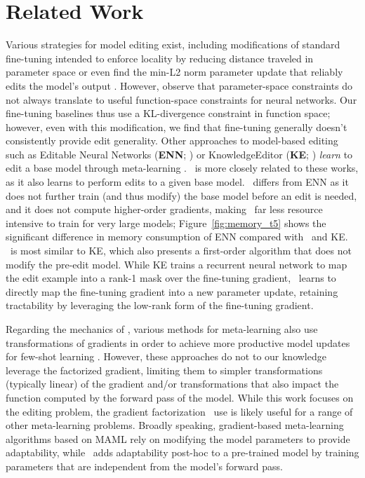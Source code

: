 \documentclass{article}
\begin{document}
\section{Related Work}



Various strategies for model editing exist, including modifications of standard fine-tuning intended to enforce locality by reducing distance traveled in parameter space \citep{zhu2020modifying} or even find the min-L2 norm parameter update that reliably edits the model's output \citep{Sotoudeh2021ProvableRO}. However, \cite{Cao2021EditingFK} observe that parameter-space constraints do not always translate to useful function-space constraints for neural networks. Our fine-tuning baselines thus use a KL-divergence constraint in function space; however, even with this modification, we find that fine-tuning generally doesn't consistently provide edit generality. Other approaches to model-based editing such as Editable Neural Networks (\textbf{ENN}; \cite{Sinitsin2020Editable}) or KnowledgeEditor (\textbf{KE}; \cite{Cao2021EditingFK}) \textit{learn} to edit a base model through meta-learning \citep{finn2017maml,ha2017hyper}. \name~is more closely related to these works, as it also learns to perform edits to a given base model. \name~differs from ENN as it does not further train (and thus modify) the base model before an edit is needed, and it does not compute higher-order gradients, making \name~far less resource intensive to train for very large models; Figure~\ref{fig:memory_t5} shows the significant difference in memory consumption of ENN compared with \name~and KE. \name~is most similar to KE, which also presents a first-order algorithm that does not modify the pre-edit model. While KE trains a recurrent neural network to map the edit example into a rank-1 mask over the fine-tuning gradient, \name~learns to directly map the fine-tuning gradient into a new parameter update, retaining tractability by leveraging the low-rank form of the fine-tuning gradient.

Regarding the mechanics of \name, various methods for meta-learning also use transformations of gradients in order to achieve more productive model updates for few-shot learning \citep{Ravi2017OptimizationAA,li2017metasgd,lee2018gradient,park2019meta,Flennerhag2020Meta-Learning}. However, these approaches do not to our knowledge leverage the factorized gradient, limiting them to simpler transformations (typically linear) of the gradient and/or transformations that also impact the function computed by the forward pass of the model. While this work focuses on the editing problem, the gradient factorization \name~use is likely useful for a range of other meta-learning problems. Broadly speaking, gradient-based meta-learning algorithms based on MAML \citep{finn2017maml,lee2018gradient,park2019meta,Flennerhag2020Meta-Learning} rely on modifying the model parameters to provide adaptability, while \name~adds adaptability post-hoc to a pre-trained model by training parameters that are independent from the model's forward pass.
\end{document}
